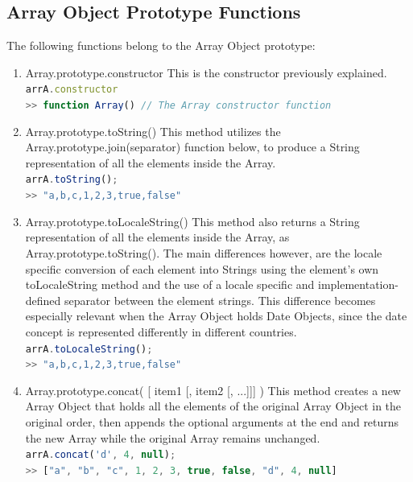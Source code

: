 \documentclass[a4paper,11pt,twoside]{report}
\def\jsinline{\lstinline[language=JavaScript, basicstyle=\small]}%\end{lstlisting}
\begin{document}
\subsection{Array Object Prototype Functions}
The following functions belong to the Array Object prototype: 
\begin{enumerate}
\item Array.prototype.constructor \newline
This is the constructor previously explained.\\
\jsinline|arrA.constructor| \\
\jsinline|>> function Array() // The Array constructor function|

\item Array.prototype.toString() \newline
This method utilizes the Array.prototype.join(separator) function below, to produce a String representation of all the elements inside the Array.\\
\jsinline|arrA.toString();|\\
\jsinline|>> "a,b,c,1,2,3,true,false"|

\item Array.prototype.toLocaleString() \newline
This method also returns a String representation of all the elements inside the Array, as Array.prototype.toString(). The main differences however, are the locale specific conversion of each element into Strings using the element's own toLocaleString method and the use of a locale specific and implementation-defined separator between the element strings. This difference becomes especially relevant when the Array Object holds Date Objects, since the date concept is represented differently in different countries.\\
\jsinline|arrA.toLocaleString();|\\
\jsinline|>> "a,b,c,1,2,3,true,false"|

\item Array.prototype.concat( [ item1 [, item2 [, ...]]] ) \newline
This method creates a new Array Object that holds all the elements of the original Array Object in the original order, then appends the optional arguments at the end and returns the new Array while the original Array remains unchanged.\\
\jsinline|arrA.concat('d', 4, null);|\\
\jsinline|>> ["a", "b", "c", 1, 2, 3, true, false, "d", 4, null]|


\end{enumerate}
\end{document}
